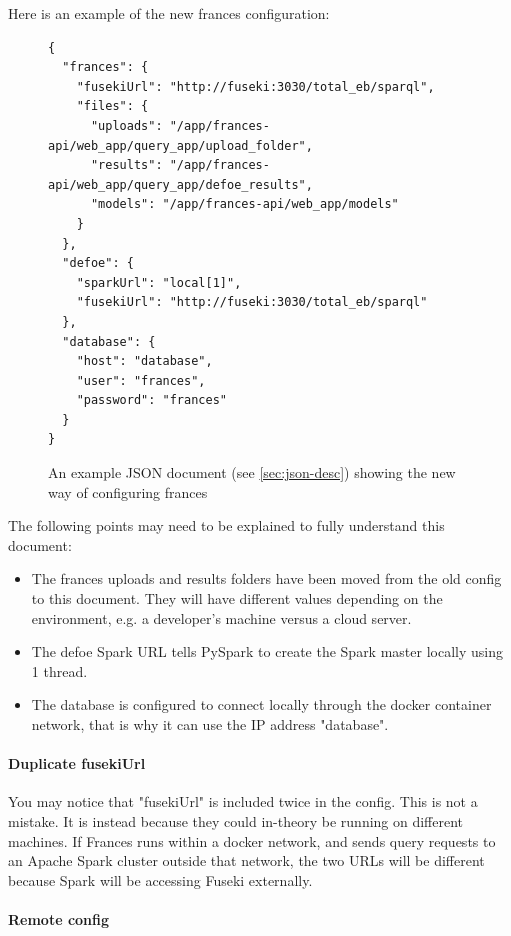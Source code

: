 \documentclass[12pt, letterpaper]{article}
\begin{document}
Here is an example of the new frances configuration:
\begin{flushleft}
\begin{figure}[H]
\begin{verbatim}
{
  "frances": {
    "fusekiUrl": "http://fuseki:3030/total_eb/sparql",
    "files": {
      "uploads": "/app/frances-api/web_app/query_app/upload_folder",
      "results": "/app/frances-api/web_app/query_app/defoe_results",
      "models": "/app/frances-api/web_app/models"
    }
  },
  "defoe": {
    "sparkUrl": "local[1]",
    "fusekiUrl": "http://fuseki:3030/total_eb/sparql"
  },
  "database": {
    "host": "database",
    "user": "frances",
    "password": "frances"
  }
}
\end{verbatim}
\caption{An example JSON document (see \ref{sec:json-desc}) showing the new way of configuring frances}
\end{figure}
\end{flushleft}

The following points may need to be explained to fully understand this document:
\begin{itemize}
    \item The frances uploads and results folders have been moved from the old config to this document. They will have different values depending on the environment, e.g. a developer's machine versus a cloud server.
    \item The defoe Spark URL tells PySpark to create the Spark master locally using 1 thread.
    \item The database is configured to connect locally through the docker container network, that is why it can use the IP address "database".
\end{itemize}

\paragraph{Duplicate fusekiUrl}

\begin{flushleft}
You may notice that "fusekiUrl" is included twice in the config. This is not a mistake. It is instead because they could in-theory be running on different machines. If Frances runs within a docker network, and sends query requests to an Apache Spark cluster outside that network, the two URLs will be different because Spark will be accessing Fuseki externally. 
\end{flushleft}

\paragraph{Remote config}\label{sec:impl-config-remote}
\end{document}

